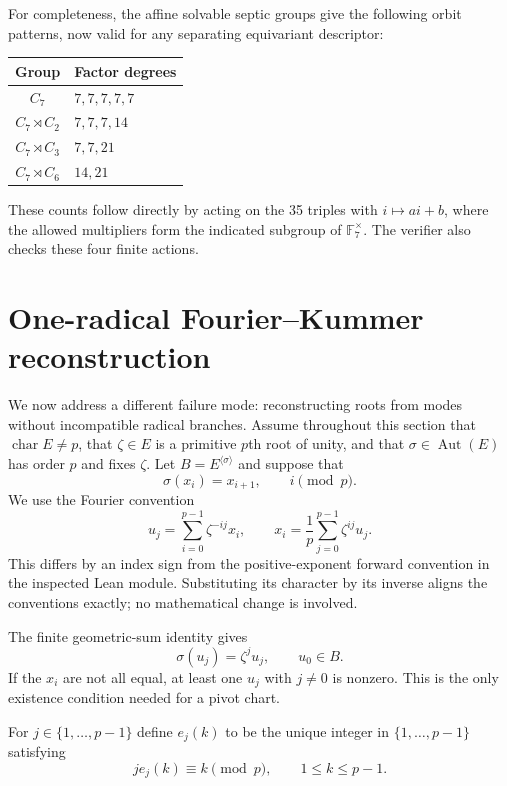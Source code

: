 \documentclass[11pt,a4paper]{article}
\theoremstyle{definition}
\theoremstyle{remark}
\newcommand{\F}{\mathbb F}
\newcommand{\charac}{\operatorname{char}}
\begin{document}
For completeness, the affine solvable septic groups give the following
orbit patterns, now valid for any separating equivariant descriptor:
\begin{center}
\begin{tabular}{@{}cl@{}}
\toprule
Group & Factor degrees\\
\midrule
$C_7$ & $7,7,7,7,7$\\
$C_7\rtimes C_2$ & $7,7,7,14$\\
$C_7\rtimes C_3$ & $7,7,21$\\
$C_7\rtimes C_6$ & $14,21$\\
\bottomrule
\end{tabular}
\end{center}
These counts follow directly by acting on the 35 triples with
$i\mapsto ai+b$, where the allowed multipliers form the indicated subgroup
of $\F_7^\times$. The verifier also checks these four finite actions.

\section{One-radical Fourier--Kummer reconstruction}
\label{rss:sec:atlas}

We now address a different failure mode: reconstructing roots from modes
without incompatible radical branches. Assume throughout this section that
$\charac E\neq p$, that $\zeta\in E$ is a primitive $p$th root of unity,
and that $\sigma\in\operatorname{Aut}(E)$ has order $p$ and fixes $\zeta$.
Let $B=E^{\langle\sigma\rangle}$ and suppose that
\[
 \sigma(x_i)=x_{i+1},\qquad i\pmod p.
\]
We use the Fourier convention
\begin{equation}
 u_j=\sum_{i=0}^{p-1}\zeta^{-ij}x_i,
 \qquad
 x_i=\frac1p\sum_{j=0}^{p-1}\zeta^{ij}u_j.
 \label{rss:eq:fourier}
\end{equation}
This differs by an index sign from the positive-exponent forward convention
in the inspected Lean module. Substituting its character by its inverse
aligns the conventions exactly; no mathematical change is involved.

The finite geometric-sum identity gives
\[
 \sigma(u_j)=\zeta^j u_j,
 \qquad u_0\in B.
\]
If the $x_i$ are not all equal, at least one $u_j$ with $j\neq0$ is nonzero.
This is the only existence condition needed for a pivot chart.

For $j\in\{1,\ldots,p-1\}$ define $e_j(k)$ to be the unique integer in
$\{1,\ldots,p-1\}$ satisfying
\[
 j e_j(k)\equiv k\pmod p,\qquad 1\leq k\leq p-1.
\]
\end{document}
